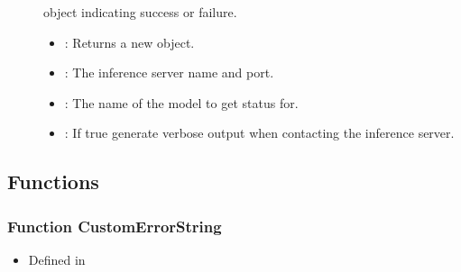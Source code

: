 \documentclass[letterpaper,10pt,english]{sphinxmanual}
\begin{document}
\begin{fulllineitems}
\begin{fulllineitems}
\begin{description}
\item[{}] \leavevmode
{\hyperref[\detokenize{cpp_api/classnvidia_1_1inferenceserver_1_1client_1_1Error:classnvidia_1_1inferenceserver_1_1client_1_1Error}]{}} object indicating success or failure. 

\item[{}] \leavevmode\begin{itemize}
\item {} 
: Returns a new {\hyperref[\detokenize{cpp_api/classnvidia_1_1inferenceserver_1_1client_1_1ServerStatusHttpContext:classnvidia_1_1inferenceserver_1_1client_1_1ServerStatusHttpContext}]{}} object. 

\item {} 
: The inference server name and port. 

\item {} 
: The name of the model to get status for. 

\item {} 
: If true generate verbose output when contacting the inference server. 

\end{itemize}

\end{description}


\end{fulllineitems}


\end{fulllineitems}



\subsection{Functions}
\label{\detokenize{cpp_api/cpp_api_root:functions}}

\subsubsection{Function CustomErrorString}
\label{\detokenize{cpp_api/function_custom_8h_1aedfdcb69f8eaab594173b197b10dc804:function-customerrorstring}}\label{\detokenize{cpp_api/function_custom_8h_1aedfdcb69f8eaab594173b197b10dc804:exhale-function-custom-8h-1aedfdcb69f8eaab594173b197b10dc804}}\label{\detokenize{cpp_api/function_custom_8h_1aedfdcb69f8eaab594173b197b10dc804::doc}}\begin{itemize}
\item {} 
Defined in {\hyperref[\detokenize{cpp_api/file_src_servables_custom_custom.h:file-src-servables-custom-custom-h}]{}}

\end{itemize}
\end{document}
